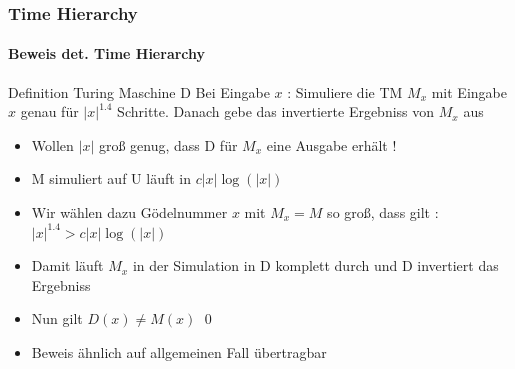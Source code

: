 \begin{frame}
	\frametitle{Time Hierarchy}
	\framesubtitle{Beweis det. Time Hierarchy}
	\begin{KITinfoblock}{Definition Turing Maschine D} 
		Bei Eingabe $x$ : Simuliere die TM $M_x$ mit Eingabe $x$ genau für $|x|^{1.4}$
		 Schritte. Danach gebe das invertierte Ergebniss von $M_x$	aus			
	\end{KITinfoblock}
	
	\begin{itemize}[<+->]
		\item Wollen $|x|$ groß genug, dass D für $M_x$ eine Ausgabe erhält !
		\item M simuliert auf U läuft in $c|x|\log(|x|)$
		\item Wir wählen dazu Gödelnummer $x$ mit $M_x = M$ so groß, dass gilt :
			$|x|^{1.4} > c|x|\log(|x|)$		
		\item Damit läuft $M_x$ in der Simulation in D komplett durch und D invertiert
			das Ergebniss
		\item Nun gilt $D(x) \neq M(x)$ 	\qed 
		\item Beweis ähnlich auf allgemeinen Fall übertragbar
	\end{itemize}
\end{frame}
